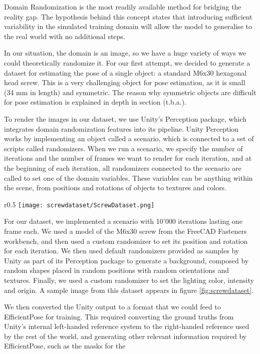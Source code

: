 Domain Randomization\cite{domainRandomization} is the most readily available method for bridging the reality gap. The hypothesis behind this concept states that introducing sufficient variability in the simulated training domain will allow the model to generalise to the real world with no additional steps.

In our situation, the domain is an image, so we have a huge variety of ways we could theoretically randomize it. For our first attempt, we decided to generate a dataset for estimating the pose of a single object: a standard M6x30 hexagonal head screw. This is a very challenging object for pose estimation, as it is small (34 mm in length) and symmetric. The reason why symmetric objects are difficult for pose estimation is explained in depth in section (t.b.a.).

To render the images in our dataset, we use Unity's Perception package\cite{unityPerception}, which integrates domain randomization features into its pipeline. Unity Perception works by implementing an object called a scenario, which is connected to a set of scripts called randomizers. When we run a scenario, we specify the number of iterations and the number of frames we want to render for each iteration, and at the beginning of each iteration, all randomizers connected to the scenario are called to set one of the domain variables. These variables can be anything within the scene, from positions and rotations of objects to textures and colors.

\begin{wrapfigure}{r}{0.5\textwidth}
    \centering
    \texttt{[image: screwdataset/ScrewDataset.png]}
    \caption{A sample of an image generated with Unity's Perception package.}
    \label{fig:screwdataset}
\end{wrapfigure}

For our dataset, we implemented a scenario with 10'000 iterations lasting one frame each. We used a model of the M6x30 screw from the FreeCAD Fasteners workbench\cite{Fasteners}, and then used a custom randomizer to set its position and rotation for each iteration. We then used default randomizers provided as samples by Unity as part of its Perception package to generate a background, composed by random shapes placed in random positions with random orientations and textures. Finally, we used a custom randomizer to set the lighting color, intensity and origin. A sample image from this dataset appears in figure \ref{fig:screwdataset}.

We then converted the Unity output to a format that we could feed to EfficientPose for training. This required converting the ground truths from Unity's internal left-handed reference system to the right-handed reference used by the rest of the world, and generating other relevant information required by EfficientPose, such as the masks for the  